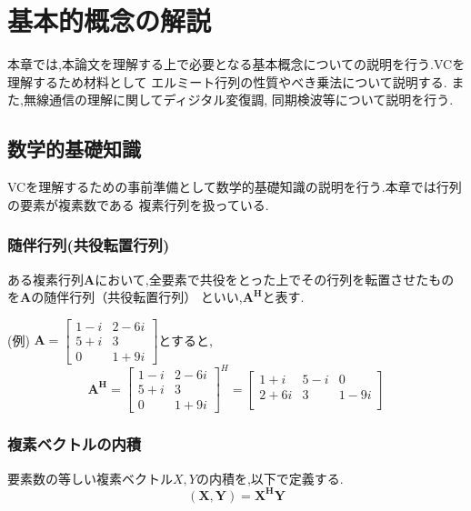 \chapter{基本的概念の解説}
本章では,本論文を理解する上で必要となる基本概念についての説明を行う.VCを理解するため材料として
エルミート行列の性質やべき乗法について説明する. \cite{strang} また,無線通信の理解に関してディジタル変復調,
同期検波等について説明を行う.

\section{数学的基礎知識}
VCを理解するための事前準備として数学的基礎知識の説明を行う.本章では行列の要素が複素数である
複素行列を扱っている.

\subsection{随伴行列(共役転置行列)}
ある複素行列$\bm{A}$において,全要素で共役をとった上でその行列を転置させたものを$\bm{A}$の随伴行列（共役転置行列）
といい,$\bm{A^H}$と表す.

(例)\quad
$
  \bm{A} = \left[
    \begin{array}{cc}
      1-i & 2-6i \\
      5+i & 3 \\
      0 & 1+9i
    \end{array}
  \right]
$とすると,
\vspace{1mm}
\begin{equation}
    \bm{A^H} = \left[
        \begin{array}{cc}
            1-i & 2-6i \\
            5+i & 3 \\
            0 & 1+9i
        \end{array}
    \right]^H 
    = \left[
        \begin{array}{ccc}
            1+i & 5-i & 0 \\
            2+6i & 3 & 1-9i \\
        \end{array}
    \right] \nonumber
\end{equation}

\subsection{複素ベクトルの内積}
要素数の等しい複素ベクトル$X,Y$の内積を,以下で定義する.
\begin{equation}
    (\bm{X},\bm{Y}) = \bm{X^HY}
\end{equation}

